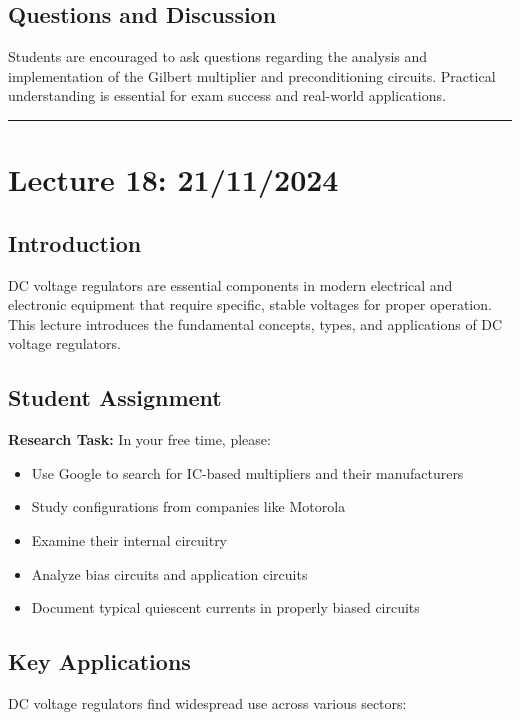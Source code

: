 \documentclass[a4paper,9pt,twoside,openany,twocolumn]{memoir}
\begin{document}
\subsection{Questions and Discussion}
Students are encouraged to ask questions regarding the analysis and implementation of the Gilbert multiplier and preconditioning circuits. Practical understanding is essential for exam success and real-world applications.
\begin{center}\rule{0.5\linewidth}{0.5pt}\end{center}
\section{Lecture 18: 21/11/2024}

\subsection{Introduction}
DC voltage regulators are essential components in modern electrical and electronic equipment that require specific, stable voltages for proper operation. This lecture introduces the fundamental concepts, types, and applications of DC voltage regulators.

\subsection{Student Assignment}
\textbf{Research Task:} In your free time, please:
\begin{itemize}
    \item Use Google to search for IC-based multipliers and their manufacturers
    \item Study configurations from companies like Motorola 
    \item Examine their internal circuitry
    \item Analyze bias circuits and application circuits
    \item Document typical quiescent currents in properly biased circuits
\end{itemize}

\subsection{Key Applications}
DC voltage regulators find widespread use across various sectors:
\end{document}
